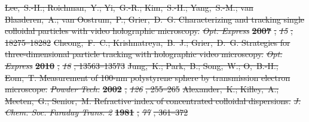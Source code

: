 \documentclass[journal=langd5,manuscript=article]{achemso}
\providecommand{\DIFdel}[1]{{\protect\color{red}\sout{#1}}}                      %
\begin{document}
\DIFdel{Lee,~S.-H.; Roichman,~Y.; Yi,~G.-R.; Kim,~S.-H.; Yang,~S.-M.; van
  Blaaderen,~A.; van Oostrum,~P.; Grier,~D.~G. Characterizing and tracking
  single colloidal particles with video holographic microscopy. }\emph{\DIFdel{Opt.
  Express}} %
\textbf{\DIFdel{2007}}%
\DIFdel{, }\emph{\DIFdel{15}}%
\DIFdel{, 18275--18282}%
\DIFdel{Cheong,~F.~C.; Krishnatreya,~B.~J.; Grier,~D.~G. Strategies for
  three-dimensional particle tracking with holographic video microscopy.
  }\emph{\DIFdel{Opt. Express}} %
\textbf{\DIFdel{2010}}%
\DIFdel{, }\emph{\DIFdel{18}}%
\DIFdel{, 13563--13573}%
\DIFdel{Jung,~K.; Park,~B.; Song,~W.; O,~B.-H.; Eom,~T. Measurement of 100-nm
  polystyrene sphere by transmission electron microscope. }\emph{\DIFdel{Powder Tech.}}
\textbf{\DIFdel{2002}}%
\DIFdel{, }\emph{\DIFdel{126}}%
\DIFdel{, 255--265}%
\DIFdel{Alexander,~K.; Killey,~A.; Meeten,~G.; Senior,~M. Refractive index of
  concentrated colloidal dispersions. }\emph{\DIFdel{J. Chem. Soc. Faraday Trans. 2}}
\textbf{\DIFdel{1981}}%
\DIFdel{, }\emph{\DIFdel{77}}%
\DIFdel{, 361--372}%
\end{document}
